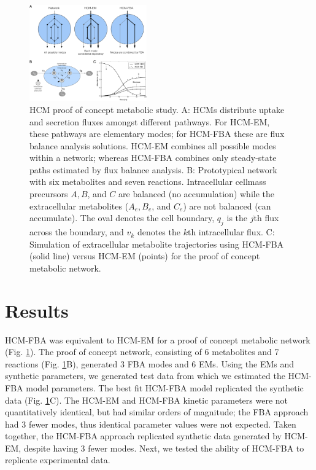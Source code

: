 \documentclass[10pt,twocolumn,twoside,final]{IEEEtran}
\begin{document}

\begin{figure}[!t]\centering
\includegraphics[width=0.45\textwidth]{./figs/Fig-1-Method-General.pdf}
\caption{HCM proof of concept metabolic study.
A: HCMs distribute uptake and secretion fluxes amongst different pathways. For HCM-EM, these pathways are elementary modes; for HCM-FBA these are flux balance analysis solutions.
HCM-EM combines all possible modes within a network; whereas HCM-FBA combines only steady-state paths estimated by flux balance analysis.
B: Prototypical network with six metabolites and seven reactions.
Intracellular cellmass precursors $A,B$, and $C$ are balanced (no accumulation) while the extracellular metabolites ($A_{e},B_{e}$, and $C_{e}$) are not balanced (can accumulate).
The oval denotes the cell boundary, $q_{j}$ is the $j$th flux across the boundary, and $v_{k}$ denotes the $k$th intracellular flux.
C: Simulation of extracellular metabolite trajectories using HCM-FBA (solid line) versus HCM-EM (points) for the proof of concept metabolic network.
}\label{fig:model-fitting}
\end{figure}

\section{Results}
HCM-FBA was equivalent to HCM-EM for a proof of concept metabolic network (Fig. \ref{fig:model-fitting}).
The proof of concept network, consisting of 6 metabolites and 7 reactions (Fig. \ref{fig:model-fitting}B), generated 3 FBA modes and 6 EMs.
Using the EMs and synthetic parameters, we generated test data from which we estimated the HCM-FBA model parameters.
The best fit HCM-FBA model replicated the synthetic data (Fig. \ref {fig:model-fitting}C).
The HCM-EM and HCM-FBA kinetic parameters were not quantitatively identical, but had similar orders of magnitude;
the FBA approach had 3 fewer modes, thus identical parameter values were not expected.
Taken together, the HCM-FBA approach replicated synthetic data generated by HCM-EM, despite having 3 fewer modes.
Next, we tested the ability of HCM-FBA to replicate experimental data.
\end{document}
